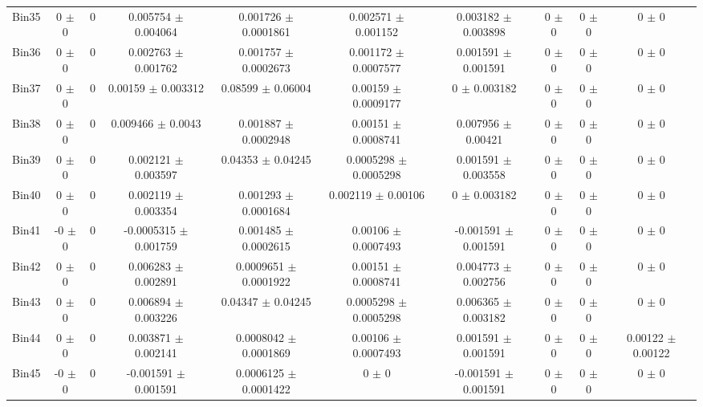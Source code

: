 \begin{tabular}{@{\extracolsep{4pt}}lccccccccc@{}}
     Bin35 & 0 $\pm$ 0 & 0 & 0.005754 $\pm$ 0.004064 & 0.001726 $\pm$ 0.0001861 & 0.002571 $\pm$ 0.001152 & 0.003182 $\pm$ 0.003898 & 0 $\pm$ 0 & 0 $\pm$ 0 & 0 $\pm$ 0 \\ 
     Bin36 & 0 $\pm$ 0 & 0 & 0.002763 $\pm$ 0.001762 & 0.001757 $\pm$ 0.0002673 & 0.001172 $\pm$ 0.0007577 & 0.001591 $\pm$ 0.001591 & 0 $\pm$ 0 & 0 $\pm$ 0 & 0 $\pm$ 0 \\ 
     Bin37 & 0 $\pm$ 0 & 0 & 0.00159 $\pm$ 0.003312 & 0.08599 $\pm$ 0.06004 & 0.00159 $\pm$ 0.0009177 & 0 $\pm$ 0.003182 & 0 $\pm$ 0 & 0 $\pm$ 0 & 0 $\pm$ 0 \\ 
     Bin38 & 0 $\pm$ 0 & 0 & 0.009466 $\pm$ 0.0043 & 0.001887 $\pm$ 0.0002948 & 0.00151 $\pm$ 0.0008741 & 0.007956 $\pm$ 0.00421 & 0 $\pm$ 0 & 0 $\pm$ 0 & 0 $\pm$ 0 \\ 
     Bin39 & 0 $\pm$ 0 & 0 & 0.002121 $\pm$ 0.003597 & 0.04353 $\pm$ 0.04245 & 0.0005298 $\pm$ 0.0005298 & 0.001591 $\pm$ 0.003558 & 0 $\pm$ 0 & 0 $\pm$ 0 & 0 $\pm$ 0 \\ 
     Bin40 & 0 $\pm$ 0 & 0 & 0.002119 $\pm$ 0.003354 & 0.001293 $\pm$ 0.0001684 & 0.002119 $\pm$ 0.00106 & 0 $\pm$ 0.003182 & 0 $\pm$ 0 & 0 $\pm$ 0 & 0 $\pm$ 0 \\ 
     Bin41 & -0 $\pm$ 0 & 0 & -0.0005315 $\pm$ 0.001759 & 0.001485 $\pm$ 0.0002615 & 0.00106 $\pm$ 0.0007493 & -0.001591 $\pm$ 0.001591 & 0 $\pm$ 0 & 0 $\pm$ 0 & 0 $\pm$ 0 \\ 
     Bin42 & 0 $\pm$ 0 & 0 & 0.006283 $\pm$ 0.002891 & 0.0009651 $\pm$ 0.0001922 & 0.00151 $\pm$ 0.0008741 & 0.004773 $\pm$ 0.002756 & 0 $\pm$ 0 & 0 $\pm$ 0 & 0 $\pm$ 0 \\ 
     Bin43 & 0 $\pm$ 0 & 0 & 0.006894 $\pm$ 0.003226 & 0.04347 $\pm$ 0.04245 & 0.0005298 $\pm$ 0.0005298 & 0.006365 $\pm$ 0.003182 & 0 $\pm$ 0 & 0 $\pm$ 0 & 0 $\pm$ 0 \\ 
     Bin44 & 0 $\pm$ 0 & 0 & 0.003871 $\pm$ 0.002141 & 0.0008042 $\pm$ 0.0001869 & 0.00106 $\pm$ 0.0007493 & 0.001591 $\pm$ 0.001591 & 0 $\pm$ 0 & 0 $\pm$ 0 & 0.00122 $\pm$ 0.00122 \\ 
     Bin45 & -0 $\pm$ 0 & 0 & -0.001591 $\pm$ 0.001591 & 0.0006125 $\pm$ 0.0001422 & 0 $\pm$ 0 & -0.001591 $\pm$ 0.001591 & 0 $\pm$ 0 & 0 $\pm$ 0 & 0 $\pm$ 0 \\ 
\hline\hline
  \end{tabular}
